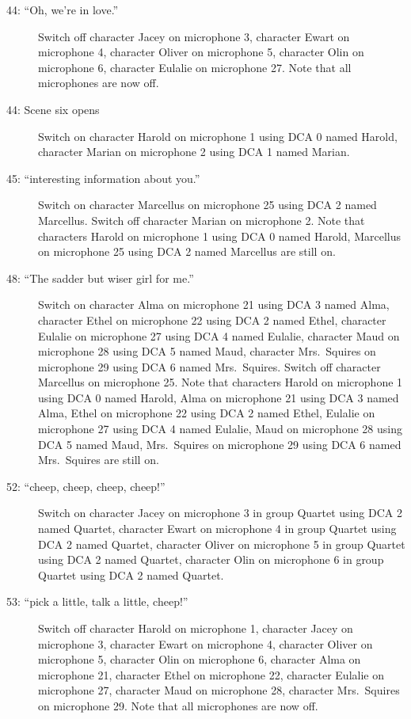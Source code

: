\begin{description}
\item[44: ``Oh, we're in love.'']
Switch off character Jacey on microphone 3, character Ewart on microphone 4, character Oliver on microphone 5, character Olin on microphone 6, character Eulalie on microphone 27. Note that all microphones are now off.

\item[44: Scene six opens]
Switch on character Harold on microphone 1 using DCA 0 named Harold, character Marian on microphone 2 using DCA 1 named Marian. 

\item[45: ``interesting information about you.'']
Switch on character Marcellus on microphone 25 using DCA 2 named Marcellus. Switch off character Marian on microphone 2. Note that characters Harold on microphone 1 using DCA 0 named Harold, Marcellus on microphone 25 using DCA 2 named Marcellus are still on.  

\item[48: ``The sadder but wiser girl for me.'']
Switch on character Alma on microphone 21 using DCA 3 named Alma, character Ethel on microphone 22 using DCA 2 named Ethel, character Eulalie on microphone 27 using DCA 4 named Eulalie, character Maud on microphone 28 using DCA 5 named Maud, character Mrs.~Squires on microphone 29 using DCA 6 named Mrs.~Squires. Switch off character Marcellus on microphone 25. Note that characters Harold on microphone 1 using DCA 0 named Harold, Alma on microphone 21 using DCA 3 named Alma, Ethel on microphone 22 using DCA 2 named Ethel, Eulalie on microphone 27 using DCA 4 named Eulalie, Maud on microphone 28 using DCA 5 named Maud, Mrs.~Squires on microphone 29 using DCA 6 named Mrs.~Squires are still on.  

\item[52: ``cheep, cheep, cheep, cheep!'']
Switch on character Jacey on microphone 3 in group Quartet using DCA 2 named Quartet, character Ewart on microphone 4 in group Quartet using DCA 2 named Quartet, character Oliver on microphone 5 in group Quartet using DCA 2 named Quartet, character Olin on microphone 6 in group Quartet using DCA 2 named Quartet. 

\item[53: ``pick a little, talk a little, cheep!'']
Switch off character Harold on microphone 1, character Jacey on microphone 3, character Ewart on microphone 4, character Oliver on microphone 5, character Olin on microphone 6, character Alma on microphone 21, character Ethel on microphone 22, character Eulalie on microphone 27, character Maud on microphone 28, character Mrs.~Squires on microphone 29. Note that all microphones are now off.


\end{description}
